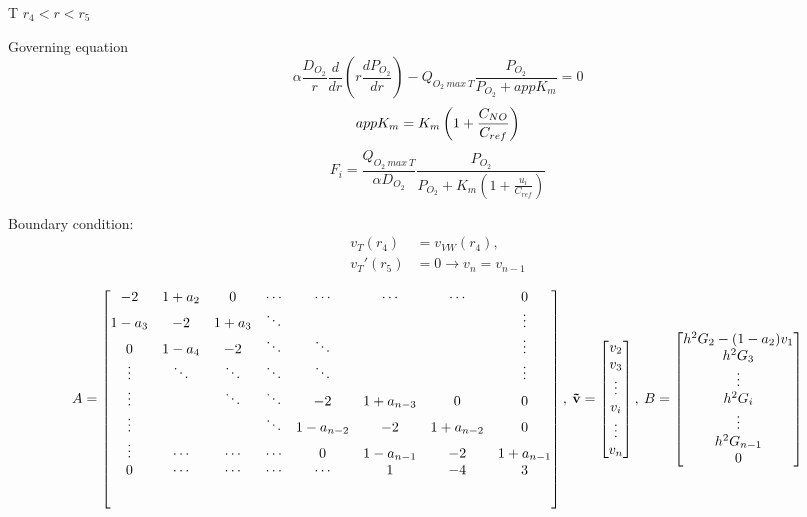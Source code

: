 \documentclass[8pt, a4paper]{article}
\begin{document}
  T $r_4<r<r_5$
  
  Governing equation
  \begin{equation*}
  \alpha\frac{D_{O_2}}{r}\frac{d}{dr}\left(r\frac{dP_{O_2}}{dr}\right)-Q_{O_2\:
    max\:T}\frac{P_{O_2}}{P_{O_2}+appK_m}=0
  \end{equation*}
  \begin{equation}
  appK_m=K_m\left(1+\frac{C_{NO}}{C_{ref}}\right)
  \end{equation}
  \begin{equation*}
  F_i=\frac{Q_{O_2\:max\:T}}{\alpha 
    D_{O_2}}\frac{P_{O_2}}{P_{O_2}+K_m\left(1+\frac{u_i}{C_{ref}}\right)}
  \end{equation*}
  
  Boundary condition:
  \begin{align*}
  v_{T}(r_4)&=v_{VW}(r_4),\\
  v_{T}'(r_5)&=0\rightarrow v_n=v_{n-1}
  \end{align*}
  
  \setlength{\extrarowheight}{1.25\baselineskip}
  \begin{equation}
  A=
  \begin{bmatrix}
  -2 & 1+a_2 & 0 & \cdots & \cdots & \cdots & \cdots & 0\\
  1-a_3 & -2 & 1+a_3 & \ddots & & & & \vdots\\
  0 & 1-a_4 & -2 & \ddots & \ddots & &  & \vdots\\
  \vdots & \ddots & \ddots & \ddots & \ddots & & & \vdots\\
  \vdots & & \ddots & \ddots & -2 & 1+a_{n-3} & 0 & 0 \\
  \vdots & & & \ddots & 1-a_{n-2} & -2 & 1+a_{n-2} & 0\\
  \vdots & \cdots & \cdots & \cdots & 0 & 1-a_{n-1} & -2 & 1+a_{n-1}\\
  0 & \cdots & \cdots & \cdots & \cdots & 1 & -4 & 3\\[5ex]
  \end{bmatrix},\:
  \mathbf{\vec{v}}=
  \begin{bmatrix}
  v_2\\
  v_3\\
  \vdots\\
  v_i\\
  \vdots\\
  v_n
  \end{bmatrix},\:
  B=
  \begin{bmatrix}
  h^2G_2-(1-a_2)v_1\\
  h^2G_3\\
  \vdots\\
  h^2G_i\\
  \vdots\\
  h^2G_{n-1}\\
  0
  \end{bmatrix}
  \end{equation}
\end{document}
